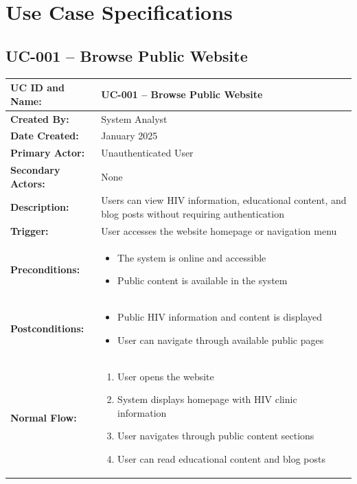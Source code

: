 \documentclass[12pt,a4paper]{article}
\begin{document}
\section{Use Case Specifications}

\subsection{UC-001 – Browse Public Website}

\renewcommand{\arraystretch}{1.5}
\begin{longtable}{|p{4.5cm}|p{10.5cm}|}
\hline
\textbf{UC ID and Name:} & UC-001 – Browse Public Website \\
\hline
\textbf{Created By:} & System Analyst \\
\hline
\textbf{Date Created:} & January 2025 \\
\hline
\textbf{Primary Actor:} & Unauthenticated User \\
\hline
\textbf{Secondary Actors:} & None \\
\hline
\textbf{Description:} & Users can view HIV information, educational content, and blog posts without requiring authentication \\
\hline
\textbf{Trigger:} & User accesses the website homepage or navigation menu \\
\hline
\textbf{Preconditions:} &
\begin{itemize}
  \item The system is online and accessible
  \item Public content is available in the system
\end{itemize} \\
\hline
\textbf{Postconditions:} &
\begin{itemize}
  \item Public HIV information and content is displayed
  \item User can navigate through available public pages
\end{itemize} \\
\hline
\textbf{Normal Flow:} &
\begin{enumerate}
  \item User opens the website
  \item System displays homepage with HIV clinic information
  \item User navigates through public content sections
  \item User can read educational content and blog posts
\end{enumerate} \\

\end{longtable}
\end{document}
